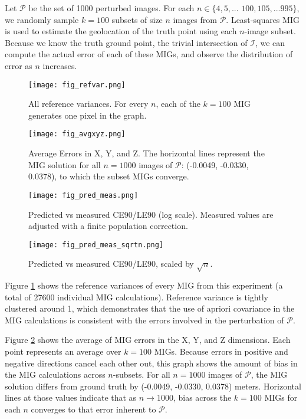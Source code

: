 \documentclass[10pt]{amsart}
\newcommand{\Iimg}{\mathcal{I}}
\newcommand{\Pimg}{\mathcal{P}}
\begin{document}
Let $\Pimg$ be the set of 1000 perturbed images. For each
$n\in\{4,5,...$ $100,105,...995\}$, we randomly sample $k=100$ subsets of size
$n$ images from $\Pimg$. Least-squares MIG is used to estimate the geolocation
of the truth point using each $n$-image subset. Because we know the truth ground
point, the trivial intersection of $\Iimg$, we can compute the actual error of
each of these MIGs, and observe the distribution of error as $n$ increases.

\begin{figure}
\texttt{[image: fig\_refvar.png]}
\caption{\label{fig:vanillaref}All reference variances. For every $n$, each of
  the $k=100$ MIG generates one pixel in the graph.}
\end{figure}

\begin{figure}
\texttt{[image: fig\_avgxyz.png]}
\caption{\label{fig:vanillaxyz}Average Errors in X, Y, and Z. The horizontal
  lines represent the MIG solution for all $n=1000$ images of $\Pimg$: (-0.0049,
  -0.0330, 0.0378), to which the subset MIGs converge.}
\end{figure}

\begin{figure}
\texttt{[image: fig\_pred\_meas.png]}
\caption{\label{fig:vanilla_pred_meas}Predicted vs measured CE90/LE90 (log
  scale). Measured values are adjusted with a finite population correction.}
\end{figure}

\begin{figure}
\texttt{[image: fig\_pred\_meas\_sqrtn.png]}
\caption{\label{fig:vanilla_pred_meas_sqrtn}Predicted vs measured CE90/LE90,
  scaled by $\sqrt{n}$.}
\end{figure}

Figure \ref{fig:vanillaref} shows the reference variances of every MIG from this
experiment (a total of 27600 individual MIG calculations). Reference variance is
tightly clustered around 1, which demonstrates that the use of apriori
covariance in the MIG calculations is consistent with the errors involved in the
perturbation of $\Pimg$.

Figure \ref{fig:vanillaxyz} shows the average of MIG errors in the X, Y, and Z
dimensions. Each point represents an average over $k=100$ MIGs. Because errors
in positive and negative directions cancel each other out, this graph shows the
amount of bias in the MIG calculations across $n$-subsets. For all $n=1000$
images of $\Pimg$, the MIG solution differs from ground truth by (-0.0049,
-0.0330, 0.0378) meters. Horizontal lines at those values indicate that as
$n\rightarrow 1000$, bias across the $k=100$ MIGs for each $n$ converges to that
error inherent to $\Pimg$.
\end{document}
